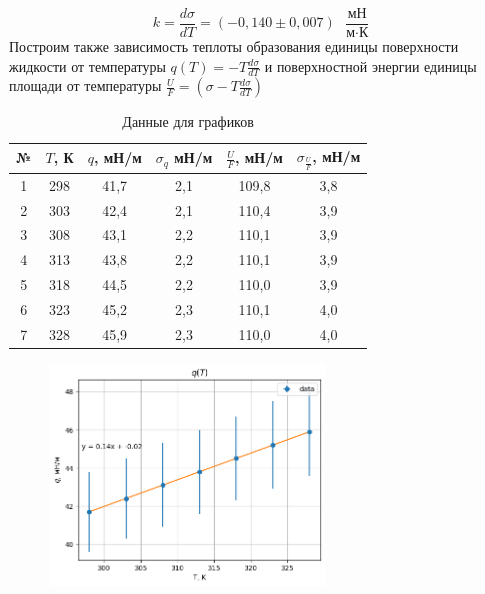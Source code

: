 \documentclass[a4paper,12pt]{article}
\begin{document}
\[ k = \frac{d\sigma}{dT} = (-0,140 \pm 0,007) \text{ } \frac{\text{мН}}{\text{м}\cdot\text{К}} \]
Построим также зависимость теплоты образования единицы поверхности жидкости от температуры $q(T) = -T \frac{d\sigma}{dT}$ и поверхностной энергии единицы площади от температуры $\frac{U}{F} = \left(\sigma - T \frac{d\sigma}{dT}\right)$

\begin{table}[H]
    \centering
    \begin{tabular}{|c|c|c|c|c|c|}
    \hline
        № & $ T $, К & $q$, мН/м & $\sigma_q$ мН/м & $\frac{U}{F}$, мН/м & $\sigma_{\frac{U}{F}}$,  мН/м\\ \hline
        1 & 298 & 41,7 & 2,1 & 109,8 & 3,8 \\ \hline
        2 & 303 & 42,4 & 2,1 & 110,4 & 3,9 \\ \hline
        3 & 308 & 43,1 & 2,2 & 110,1 & 3,9 \\ \hline
        4 & 313 & 43,8 & 2,2 & 110,1 & 3,9 \\ \hline
        5 & 318 & 44,5 & 2,2 & 110,0 & 3,9 \\ \hline
        6 & 323 & 45,2 & 2,3 & 110,1 & 4,0 \\ \hline
        7 & 328 & 45,9 & 2,3 & 110,0 & 4,0 \\ \hline
    \end{tabular}
    \caption{Данные для графиков}
\end{table}

\begin{figure}[H]
    \begin{center}
    \includegraphics[width=0.65\textwidth]{q(T).png}
    \end{center}
\end{figure}
\end{document}
